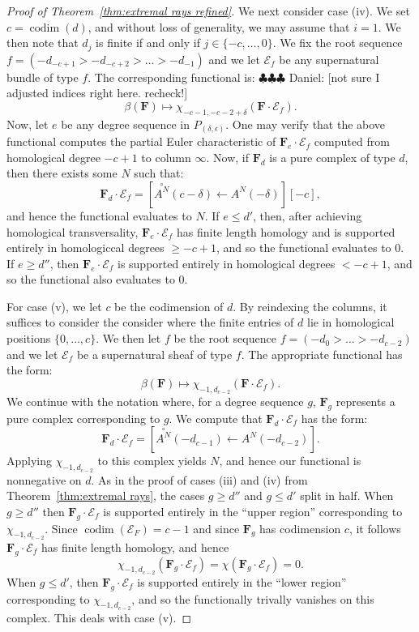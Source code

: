 \documentclass[12pt]{amsart}
\theoremstyle{definition}
\theoremstyle{remark}
\newcommand{\codim}{\operatorname{codim}}
\newcommand{\cE}{\mathcal{E}}
\newcommand{\FF}{\mathbf{F}}
\newcommand{\zp}{\circ}
\newcommand{\daniel}[1]{{\color{green} \sf $\clubsuit\clubsuit\clubsuit$ Daniel: [#1]}}
\begin{document}
\begin{proof}[Proof of Theorem~\ref{thm:extremal rays refined}]
We next consider case (iv).  We set $c=\codim(d)$, and without loss of generality, we may assume that $i=1$.  We then note that $d_j$ is finite if and only if $j\in \{-c,\dots ,0\}$.  We fix the root sequence $f=(-d_{-c+1}>-d_{-c+2}>\dots>-d_{-1})$ and we let $\cE_f$ be any supernatural bundle of type $f$.   The corresponding functional is:
\daniel{not sure I adjusted indices right here.  recheck!}
\[
\beta(\FF)\mapsto \chi_{-c-1,-c-2+\delta}(\FF\cdot \cE_f).
\]
Now, let $e$ be any degree sequence in $P_{(\delta,\epsilon)}$.  One may verify that the above functional computes the partial Euler characteristic of $\FF_e\cdot \cE_f$ computed from homological degree $-c+1$ to column $\infty$.  Now, if $\FF_d$ is a pure complex of type $d$, then there exists some $N$ such that:
\[
\FF_d\cdot \cE_f=\left[ \overset{\zp}{A^N}(c-\delta)\gets A^N(-\delta) \right][-c],
\]
and hence the functional evaluates to $N$.  If $e\leq d'$, then, after achieving homological transversality, $\FF_e\cdot \cE_f$ has finite length homology and is supported entirely in homologiccal degrees $\geq -c+1$, and so the functional evaluates to $0$.  If $e\geq d''$, then $\FF_e\cdot \cE_f$ is supported entirely in homological degrees $<-c+1$, and so the functional also evaluates to $0$.

For case (v), we let $c$ be the codimension of $d$.  By reindexing the columns, it suffices to consider the consider where the finite entries of $d$ lie in homological positions $\{0,\dots,c\}$.  We then let $f$ be the root sequence $f=(-d_0>\dots >-d_{c-2})$ and we let $\cE_f$ be a supernatural sheaf of type $f$.  The appropriate functional has the form:
\[
\beta(\FF)\mapsto \chi_{-1,d_{c-2}}(\FF\cdot \cE_f).
\]
We continue with the notation where, for a degree sequence $g$, $\FF_g$ represents a pure complex corresponding to $g$.  We compute that $\FF_d\cdot \cE_f$ has the form:
\[
\FF_d\cdot \cE_f=\left[\overset{\zp}{A^N}(-d_{c-1})\gets A^N(-d_{c-2}) \right].
\]
Applying $\chi_{-1,d_{c-2}}$ to this complex yields $N$, and hence our functional is nonnegative on $d$.  As in the proof of cases (iii) and (iv) from Theorem~\ref{thm:extremal rays}, the cases $g\geq d''$ and $g\leq d'$ split in half.  When $g\geq d''$ then $\FF_g\cdot \cE_f$ is supported entirely in the ``upper region'' corresponding to $\chi_{-1,d_{c-2}}$.  Since $\codim(\cE_F)=c-1$ and since $\FF_g$ has codimension $c$, it follows $\FF_g\cdot \cE_f$ has finite length homology, and hence
\[
\chi_{-1,d_{c-2}}(\FF_g\cdot \cE_f)=\chi(\FF_g\cdot \cE_f)=0.
\]
When $g\leq d'$, then $\FF_g\cdot \cE_f$ is supported entirely in the ``lower region'' corresponding to $\chi_{-1,d_{c-2}}$, and so the functionally trivally vanishes on this complex.  This deals with case (v).



\end{proof}
\end{document}
